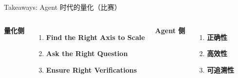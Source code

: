 \documentclass[aspectratio=169,11pt]{beamer}
\newcommand{\hl}[1]{\textcolor{lblue}{\textbf{#1}}}
\begin{document}
\begin{frame}{Takeaways: Agent 时代的量化（比赛）}
  \vspace{14pt}
  \begin{columns}[T,onlytextwidth]
    \begin{minipage}[t]{\linewidth}
    \begin{center}
      \textbf{\color{icmlblue}\Large 量化侧}
    \end{center}
    \vspace{8pt}
    \begin{enumerate}\setlength{\itemsep}{18pt}
      \item {\Large\hl{Find the Right Axis to Scale}}
      \item {\Large\hl{Ask the Right Question}}
      \item {\Large\hl{Ensure Right Verifications}}
    \end{enumerate}
    \end{minipage}

    \hspace*{2.8cm}\begin{minipage}[t]{\dimexpr\linewidth-2.8cm\relax}
    \begin{center}
      \textbf{\color{icmlblue}\Large Agent 侧}
    \end{center}
    \vspace{8pt}
    \begin{enumerate}\setlength{\itemsep}{18pt}
      \item {\Large\hl{正确性}}
      \item {\Large\hl{高效性}}
      \item {\Large\hl{可追溯性}}
    \end{enumerate}
    \end{minipage}
  \end{columns}
\end{frame}
\end{document}

